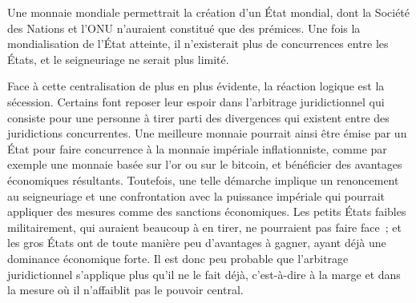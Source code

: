 Une monnaie mondiale permettrait la création d'un État mondial, dont la Société des Nations et l'ONU n'auraient constitué que des prémices. Une fois la mondialisation de l'État atteinte, il n'existerait plus de concurrences entre les États, et le seigneuriage ne serait plus limité.

Face à cette centralisation de plus en plus évidente, la réaction logique est la sécession. Certains font reposer leur espoir dans l'arbitrage juridictionnel qui consiste pour une personne à tirer parti des divergences qui existent entre des juridictions concurrentes. Une meilleure monnaie pourrait ainsi être émise par un État pour faire concurrence à la monnaie impériale inflationniste, comme par exemple une monnaie basée sur l'or ou sur le bitcoin, et bénéficier des avantages économiques résultants. Toutefois, une telle démarche implique un renoncement au seigneuriage et une confrontation avec la puissance impériale qui pourrait appliquer des mesures comme des sanctions économiques. Les petits États faibles militairement, qui auraient beaucoup à en tirer, ne pourraient pas faire face~; et les gros États ont de toute manière peu d'avantages à gagner, ayant déjà une dominance économique forte. Il est donc peu probable que l'arbitrage juridictionnel s'applique plus qu'il ne le fait déjà, c'est-à-dire à la marge et dans la mesure où il n'affaiblit pas le pouvoir central. %

